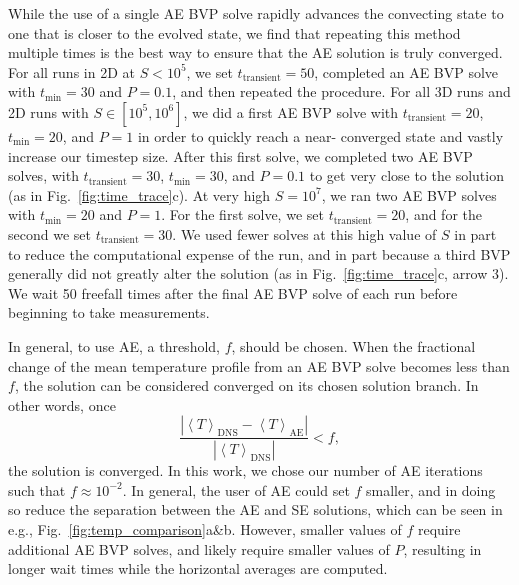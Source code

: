 \documentclass[aps, pre, onecolumn, nofootinbib, notitlepage, groupedaddress, amsfonts, amssymb, amsmath, longbibliography]{revtex4-1}
\newcommand{\angles}[1]{\ensuremath{\left\langle #1 \right\rangle}}
\begin{document}
While the use of a single AE BVP solve rapidly advances the convecting state to
one that is closer to the evolved state, we find that repeating this method 
multiple times is the best way to
ensure that the AE solution is truly converged. For all runs in 2D at $S < 10^5$, we
set $t_{\text{transient}} = 50$, completed an AE BVP solve
with $t_{\text{min}} = 30$ and $P = 0.1$, and then repeated the procedure.
For all 3D runs and 2D runs with $S \in [10^5, 10^6]$,
we did a first AE BVP solve with $t_{\text{transient}} = 20$,
$t_{\text{min}} = 20$, and $P = 1$ in order to quickly reach a near-
converged state and vastly increase our timestep size.  After this first solve, 
we completed two AE BVP solves, with $t_{\text{transient}} = 30$,
$t_{\text{min}} = 30$, 
and $P = 0.1$ to get very close to the solution (as in Fig.~\ref{fig:time_trace}c).
At very high $S = 10^7$, we ran two AE BVP solves with $t_{\text{min}} = 20$ and
$P = 1$. For the first solve, we set $t_{\text{transient}} = 20$, and for the
second we set $t_{\text{transient}} = 30$. We used fewer solves at this high
value of $S$ in part to reduce the computational expense of the run, and in
part because a third BVP generally did not greatly alter the solution
(as in Fig.~\ref{fig:time_trace}c, arrow 3). We wait 50 freefall times after
the final AE BVP solve of each run before beginning to take measurements.

In general, to use AE, a threshold, $f$, should be chosen. When the fractional
change of the mean temperature profile from an AE BVP solve becomes less than $f$,
the solution can be considered converged on its chosen solution branch.
In other words, once
\begin{equation}
\frac{|\angles{T}_{\text{DNS}} - \angles{T}_{\text{AE}}|}{|\angles{T}_{\text{DNS}}|} < f,
\end{equation}
the solution is converged. In this work, we chose our number of AE iterations
such that $f \approx 10^{-2}$.  In general, the user of AE could
set $f$ smaller, and in doing so reduce the separation between the AE and SE
solutions, which can be seen in e.g., Fig.~\ref{fig:temp_comparison}a\&b. However,
smaller values of $f$ require additional AE BVP solves, and likely require smaller values
of $P$, resulting in longer wait times while the horizontal averages are computed.






\end{document}
